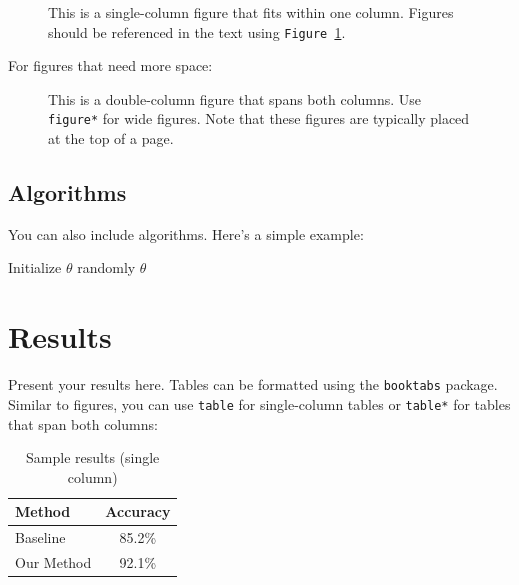 \documentclass[pmlr,twocolumn]{jmlr} %
\begin{document}
\begin{figure}[htbp]
  \centering
  \caption{This is a single-column figure that fits within one column.
    Figures should be referenced in the text using 
    \texttt{Figure~\ref{fig:sample}}.}
  \label{fig:sample}
\end{figure}

For figures that need more space:

\begin{figure}[htbp]
  \centering
  \caption{This is a double-column figure that spans both columns.
    Use \texttt{figure*} for wide figures. Note that these figures
    are typically placed at the top of a page.}
  \label{fig:wide}
\end{figure}

\subsection{Algorithms}

You can also include algorithms. Here's a simple example:

\begin{algorithm}[htbp]
  \SetAlgoLined
  Initialize $\theta$ randomly\;
  \Return $\theta$\;
  \caption{Sample stochastic gradient descent algorithm}
  \label{alg:sample}
\end{algorithm}

\section{Results}

Present your results here. Tables can be formatted using the
\texttt{booktabs} package. Similar to figures, you can use
\texttt{table} for single-column tables or \texttt{table*}
for tables that span both columns:

\begin{table}[htbp]
  \centering
  \caption{Sample results (single column)}
  \label{tab:results}
  \begin{tabular}{lc}
    \toprule
    Method & Accuracy \\
    \midrule
    Baseline & 85.2\% \\
    Our Method & 92.1\% \\
    \bottomrule
  \end{tabular}
\end{table}
\end{document}
